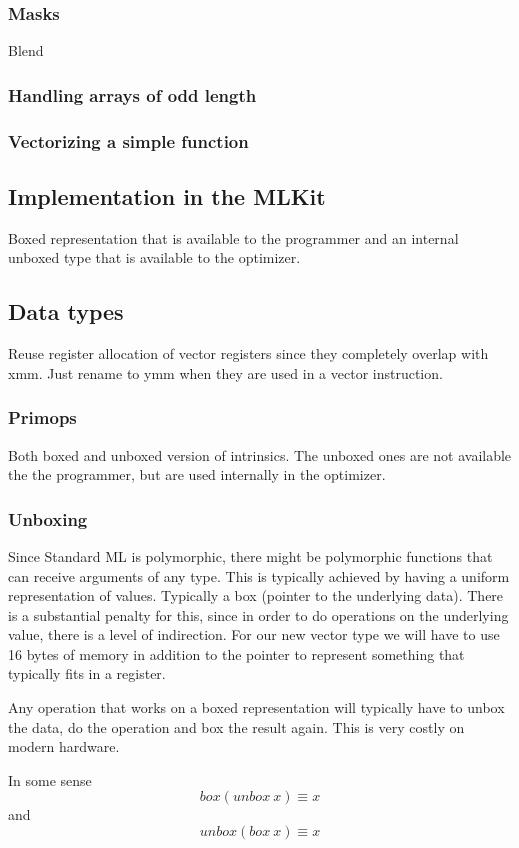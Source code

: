 \documentclass{article}
\begin{document}
\subsubsection{Masks}

Blend

\subsubsection{Handling arrays of odd length}






\subsubsection{Vectorizing a simple function}


\subsection{Implementation in the MLKit}

Boxed representation that is available to the programmer and an internal unboxed type that is available to the optimizer.

\subsection{Data types}

Reuse register allocation of vector registers since they completely overlap with xmm. Just rename to ymm when they are used in a vector instruction.

\subsubsection{Primops}

Both boxed and unboxed version of intrinsics. The unboxed ones are not available the the programmer, but are used internally in the optimizer.

\subsubsection{Unboxing}

Since Standard ML is polymorphic, there might be polymorphic functions that can receive arguments of any type. This is typically achieved by having a uniform representation of values. Typically a box (pointer to the underlying data). There is a substantial penalty for this, since in order to do operations on the underlying value, there is a level of indirection. For our new vector type we will have to use 16 bytes of memory in addition to the pointer to represent something that typically fits in a register.

Any operation that works on a boxed representation will typically have to unbox the data, do the operation and box the result again. This is very costly on modern hardware.

In some sense
\[
    box (unbox\ x) \equiv x
\]
and
\[
    unbox (box\ x) \equiv x
\]
\end{document}
